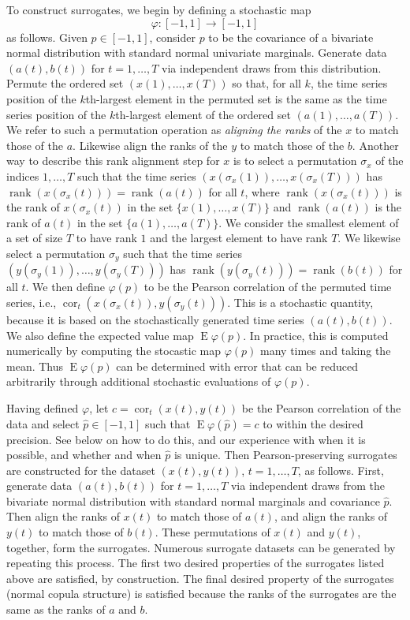 \documentclass[letterpaper,11pt]{article}
\newcommand{\E}{\operatorname{E}}
\newcommand{\cor}{\operatorname{cor}}
\newcommand{\rank}{\operatorname{rank}}
\begin{document}
To construct surrogates, we begin by defining a stochastic map
$$\varphi:[-1,1]\rightarrow[-1,1]$$ as follows. Given $p \in [-1,1]$,
consider $p$ to be the covariance of a bivariate normal distribution
with standard normal univariate marginals. Generate data 
$(a(t),b(t))$ for $t=1,\ldots,T$ via independent draws 
from this distribution. Permute the ordered set $(x(1),\ldots,x(T))$
so that, for all $k$, the time series position of the $k$th-largest element
in the permuted set is the same as the time series position of the 
$k$th-largest element of the ordered set $(a(1),\ldots,a(T))$. We refer to
such a permutation operation as \emph{aligning the ranks} of the $x$
to match those of the $a$. Likewise align the ranks of the $y$
to match those of the $b$. Another way to describe this rank alignment 
step for $x$ is to select a permutation $\sigma_x$
of the indices $1,\dots,T$ such that the time series
$(x(\sigma_x(1)),\ldots,x(\sigma_x(T)))$ has 
$\rank(x(\sigma_x(t)))=\rank(a(t))$ for all $t$, where $\rank(x(\sigma_x(t)))$ is
the rank of $x(\sigma_x(t))$ in the set $\{x(1),\ldots,x(T)\}$ and 
$\rank(a(t))$ is the rank of $a(t)$ in the set $\{a(1),\ldots,a(T)\}$.
We consider the smallest element of a set of size $T$ to have rank $1$ and
the largest element to have rank $T$. We likewise select a permutation $\sigma_y$
such that the time series $(y(\sigma_y(1)),\ldots,y(\sigma_y(T)))$ has 
$\rank(y(\sigma_y(t)))=\rank(b(t))$ for all $t$. We then define $\varphi(p)$
to be the Pearson correlation of the permuted time series, i.e.,
$\cor_t(x(\sigma_x(t)),y(\sigma_y(t)))$. This is a 
stochastic quantity, because it is based on the stochastically generated
time series $(a(t),b(t))$. We also define the expected value map
$\E\varphi(p)$. In practice, this is computed numerically by computing
the stocastic map $\varphi(p)$ many times and taking the mean. Thus
$\E\varphi(p)$ can be determined with error that can be reduced 
arbitrarily through additional stochastic evaluations of $\varphi(p)$.

Having defined $\varphi$, let $c=\cor_t(x(t),y(t))$ be the Pearson 
correlation of the data and select $\hat{p} \in [-1,1]$ such that $\E\varphi(\hat{p})=c$ 
to within the desired precision. See below on how to do this, and our experience with
when it is possible, and whether and when $\hat{p}$ is unique. Then Pearson-preserving 
surrogates are constructed for
the dataset $(x(t),y(t))$, $t=1,\ldots,T$, as follows. First, generate data 
$(a(t),b(t))$ for $t=1,\ldots,T$ via independent draws from the bivariate normal
distribution with standard normal marginals and covariance $\hat{p}$.
Then align the ranks of $x(t)$ to match those of $a(t)$, and align the ranks
of $y(t)$ to match those of $b(t)$. These permutations of $x(t)$ and $y(t)$, together, 
form the surrogates.
Numerous surrogate datasets can be generated by repeating this process.
The first two desired properties of the surrogates listed above are 
satisfied, by construction. The final desired property of the surrogates
(normal copula structure) is satisfied because the ranks of the surrogates
are the same as the ranks of $a$ and $b$. 
\end{document}
